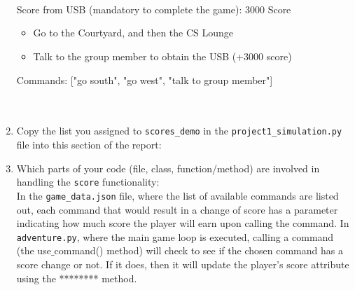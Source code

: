 \documentclass[11pt]{article}
\begin{document}
\begin{enumerate}
\\\\\\
Score from USB (mandatory to complete the game): 3000 Score
        \begin{itemize}
            \item Go to the Courtyard, and then the CS Lounge
            \item Talk to the group member to obtain the USB (+3000 score)
        \end{itemize}
Commands: ["go south", "go west", "talk to group member"]
\\\\\\

    \item Copy the list you assigned to \texttt{scores\_demo} in the \texttt{project1\_simulation.py} file into this section of the report:


    \item Which parts of your code (file, class, function/method) are involved in handling the \texttt{score} functionality:\\
        In the \texttt{game\_data.json} file, where the list of available commands are listed out, each command that would result in a change of score has a parameter indicating how much score the player will earn upon calling the command. In \texttt{adventure.py}, where the main game loop is executed, calling a command (the use$\_$command() method) will check to see if the chosen command has a score change or not. If it does, then it will update the player's score attribute using the ******** method.
\end{enumerate}
\end{document}
